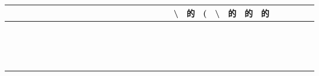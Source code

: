 \documentclass[10pt]{article}
\begin{document}
\begin{center}
\begin{tabular}{|c|c|c|c|c|c|c|c|c|c|c|c|c|c|c|c|c|c|c|c|c|c|c|c|c|c|c|c|c|c|c|c|}
\hline
 &  &  &  &  &  &  &  &  &  &  &  &  &  &  &  &  &  &  &  & \textbackslash  & 的 & ( & \textbackslash  & 的 & 的 & 的 &  &  &  &  &  \\
\hline
 &  &  &  &  &  &  &  &  &  &  &  &  &  &  &  &  &  &  &  &  &  &  &  &  &  &  &  &  &  &  &  \\
\hline
 &  &  &  &  &  &  &  &  &  &  &  &  &  &  &  &  &  &  &  &  &  &  &  &  &  &  &  &  &  &  &  \\
\hline
 &  &  &  &  &  &  &  &  &  &  &  &  &  &  &  &  &  &  &  &  &  &  &  &  &  &  &  &  &  &  &  \\
\hline
 &  &  &  &  &  &  &  &  &  &  &  &  &  &  &  &  &  &  &  &  &  &  &  &  &  &  &  &  &  &  &  \\
\hline
 &  &  &  &  &  &  &  &  &  &  &  &  &  &  &  &  &  &  &  &  &  &  &  &  &  &  &  &  &  &  &  \\
\hline
 &  &  &  &  &  &  &  &  &  &  &  &  &  &  &  &  &  &  &  &  &  &  &  &  &  &  &  &  &  &  &  \\
\hline
 &  &  &  &  &  &  &  &  &  &  &  &  &  &  &  &  &  &  &  &  &  &  &  &  &  &  &  &  &  &  &  \\
\hline
 &  &  &  &  &  &  &  &  &  &  &  &  &  &  &  &  &  &  &  &  &  &  &  &  &  &  &  &  &  &  &  \\
\hline
 &  &  &  &  &  &  &  &  &  &  &  &  &  &  &  &  &  &  &  &  &  &  &  &  &  &  &  &  &  &  &  \\
\hline
 &  &  &  &  &  &  &  &  &  &  &  &  &  &  &  &  &  &  &  &  &  &  &  &  &  &  &  &  &  &  &  \\
\hline
 &  &  &  &  &  &  &  &  &  &  &  &  &  &  &  &  &  &  &  &  &  &  &  &  &  &  &  &  &  &  &  \\
\hline
 &  &  &  &  &  &  &  &  &  &  &  &  &  &  &  &  &  &  &  &  &  &  &  &  &  &  &  &  &  &  &  \\
\hline
 &  &  &  &  &  &  &  &  &  &  &  &  &  &  &  &  &  &  &  &  &  &  &  &  &  &  &  &  &  &  &  \\
\hline
 &  &  &  &  &  &  &  &  &  &  &  &  &  &  &  &  &  &  &  &  &  &  &  &  &  &  &  &  &  &  &  \\
\hline
 &  &  &  &  &  &  &  &  &  &  &  &  &  &  &  &  &  &  &  &  &  &  &  &  &  &  &  &  &  &  &  \\
\hline
 &  &  &  &  &  &  &  &  &  &  &  &  &  &  &  &  &  &  &  &  &  &  &  &  &  &  &  &  &  &  &  \\

\end{tabular}
\end{center}
\end{document}

